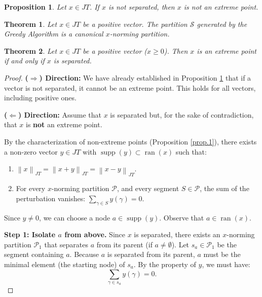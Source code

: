 \documentclass[10pt,a4paper]{amsart}
\newtheorem{proposition}{Proposition}
\newtheorem{theorem}{Theorem}
\newcommand{\JT}{JT}
\newcommand{\norm}[1]{\left\lVert#1\right\rVert}
\newcommand{\ran}{\operatorname{ran}}
\newcommand{\supp}{\operatorname{supp}}
\begin{document}
\begin{proposition}\label{prop:not_sep_not_ext}
    Let $x \in \JT$. If $x$ is not separated, then $x$ is not an extreme point.
\end{proposition}

\begin{theorem}\label{T5.9}
    Let $x \in \JT$ be a positive vector. The partition $\mathcal{S}$ generated by the Greedy Algorithm is a canonical $x$-norming partition.
\end{theorem}

\begin{theorem}
    Let $x \in \JT$ be a positive vector ($x \ge 0$). Then $x$ is an extreme point if and only if $x$ is separated.
\end{theorem}

\begin{proof}
    \textbf{($\Rightarrow$) Direction:}
    We have already established in Proposition \ref{prop:not_sep_not_ext} that if a vector is not separated, it cannot be an extreme point. This holds for all vectors, including positive ones.
    
    \textbf{($\Leftarrow$) Direction:}
    Assume that $x$ is separated but, for the sake of contradiction, that $x$ is \textbf{not} an extreme point.
    
    By the characterization of non-extreme points (Proposition \ref{prop.1}), there exists a non-zero vector $y \in \JT$
    with $\supp(y) \subset \ran(x)$ such that:
    \begin{enumerate}
        \item $\norm{x}_{\JT} = \norm{x+y}_{\JT} = \norm{x-y}_{\JT}$.
        \item For every $x$-norming partition $\mathcal{P}$, and every segment $S \in \mathcal{P}$, the sum of the perturbation vanishes: $\sum_{\gamma \in S} y(\gamma) = 0$.
    \end{enumerate}
    
    Since $y \neq 0$, we can choose a node $a \in \supp(y)$. Observe that $a \in \ran(x)$.
    
    \textbf{Step 1: Isolate $a$ from above.}
    Since $x$ is separated, there exists an $x$-norming partition $\mathcal{P}_1$ that separates $a$ from its parent (if $a \neq \emptyset$). Let $s_a \in \mathcal{P}_1$ be the segment containing $a$. Because $a$ is separated from its parent, $a$ must be the minimal element (the starting node) of $s_a$.
    By the property of $y$, we must have:
    \begin{equation}\label{eq:sum_sa}
        \sum_{\gamma \in s_a} y(\gamma) = 0.
    \end{equation}
    

\end{proof}
\end{document}
